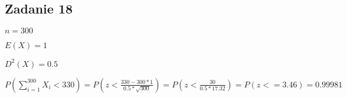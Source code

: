 \subsection{Zadanie 18}

$n = 300$

$ E(X) = 1$

$D^2(X) = 0.5$

$P(\sum\limits_{i=1}^{300}  X_{i} < 330 ) = P(z < \frac{330 - 300 * 1}{0.5 * \sqrt{300}}) = P(z < \frac{30}{0.5 * 17.32}) = P(z <= 3.46) = 0.99981$
